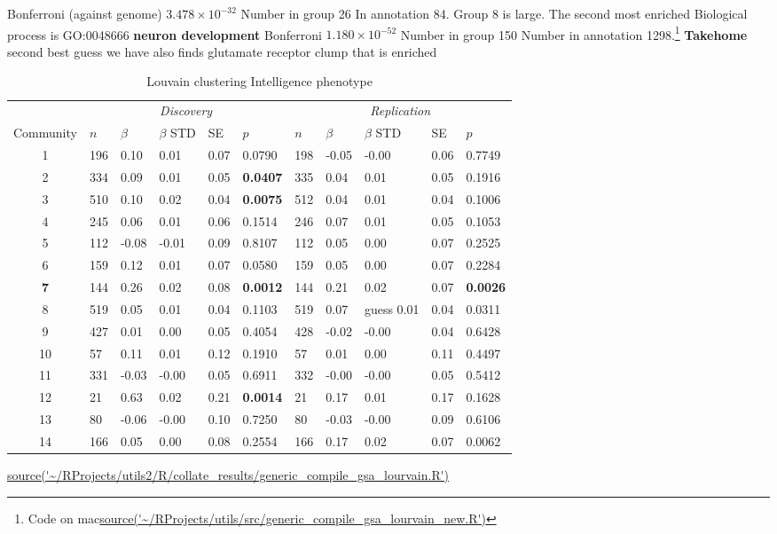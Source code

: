 Bonferroni (against genome) $3.478 \times 10^{-32}$ 	Number in group 26  In annotation	84. 
Group 8 is large. The second most enriched Biological process is GO:0048666 \textbf{	neuron development} 		Bonferroni	$1.180 \times 10^{-52}$ 	Number in group 150 	Number in annotation 1298.\footnote{Code on mac\url{source('~/RProjects/utils/src/generic_compile_gsa_lourvain_new.R')}}
\textbf{Takehome} second best guess we have also finds glutamate receptor clump that is enriched




\begin{table}[ht]
\centering
\setlength{\extrarowheight}{2pt}
\begin{tabular}{cllllllllll}
  \toprule
   &  \multicolumn{5}{c}{\textit{Discovery}} & \multicolumn{5}{c}{\textit{Replication}} \\
    \cmidrule{2-11}
Community & $n$ & $\beta$ & $\beta$ STD & SE & $p$ & $n$ & $\beta$ & $\beta$ STD & SE & $p$\\ 
  \midrule
1 & 196 & 0.10 & 0.01 & 0.07 & 0.0790 & 198 & -0.05 & -0.00 & 0.06 & 0.7749 \\ 
  2 & 334 & 0.09 & 0.01 & 0.05 & \textbf{0.0407} & 335 & 0.04 & 0.01 & 0.05 & 0.1916 \\ 
  3 & 510 & 0.10 & 0.02 & 0.04 & \textbf{0.0075} & 512 & 0.04 & 0.01 & 0.04 & 0.1006 \\ 
  4 & 245 & 0.06 & 0.01 & 0.06 & 0.1514 & 246 & 0.07 & 0.01 & 0.05 & 0.1053 \\ 
  5 & 112 & -0.08 & -0.01 & 0.09 & 0.8107 & 112 & 0.05 & 0.00 & 0.07 & 0.2525 \\ 
  6 & 159 & 0.12 & 0.01 & 0.07 & 0.0580 & 159 & 0.05 & 0.00 & 0.07 & 0.2284 \\ 
  \textbf{7} & 144 & 0.26 & 0.02 & 0.08 & \textbf{0.0012} & 144 & 0.21 & 0.02 & 0.07 & \textbf{0.0026} \\ 
  8 & 519 & 0.05 & 0.01 & 0.04 & 0.1103 & 519 & 0.07 &guess 0.01 & 0.04 & 0.0311 \\ 
  9 & 427 & 0.01 & 0.00 & 0.05 & 0.4054 & 428 & -0.02 & -0.00 & 0.04 & 0.6428 \\ 
  10 & 57 & 0.11 & 0.01 & 0.12 & 0.1910 & 57 & 0.01 & 0.00 & 0.11 & 0.4497 \\ 
  11 & 331 & -0.03 & -0.00 & 0.05 & 0.6911 & 332 & -0.00 & -0.00 & 0.05 & 0.5412 \\ 
  12 & 21 & 0.63 & 0.02 & 0.21 & \textbf{0.0014} & 21 & 0.17 & 0.01 & 0.17 & 0.1628 \\ 
  13 & 80 & -0.06 & -0.00 & 0.10 & 0.7250 & 80 & -0.03 & -0.00 & 0.09 & 0.6106 \\ 
  14 & 166 & 0.05 & 0.00 & 0.08 & 0.2554 & 166 & 0.17 & 0.02 & 0.07 & 0.0062 \\ 
   \bottomrule
\end{tabular}
\caption{Louvain clustering Intelligence phenotype} 
\label{tab:louvain clustering intelligence}
\tiny\url{source('~/RProjects/utils2/R/collate_results/generic_compile_gsa_lourvain.R')}
\end{table}


